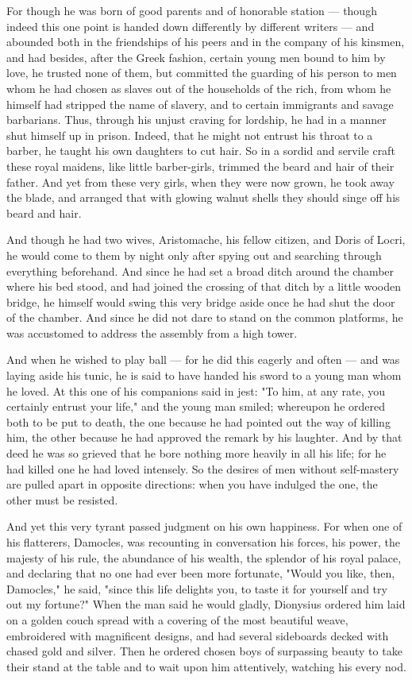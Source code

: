  For though he was born of good parents and of honorable station — though indeed this one point is handed down differently by different writers — and abounded both in the friendships of his peers and in the company of his kinsmen, and had besides, after the Greek fashion, certain young men bound to him by love, he trusted none of them, but committed the guarding of his person to men whom he had chosen as slaves out of the households of the rich, from whom he himself had stripped the name of slavery, and to certain immigrants and savage barbarians. Thus, through his unjust craving for lordship, he had in a manner shut himself up in prison. Indeed, that he might not entrust his throat to a barber, he taught his own daughters to cut hair. So in a sordid and servile craft these royal maidens, like little barber-girls, trimmed the beard and hair of their father. And yet from these very girls, when they were now grown, he took away the blade, and arranged that with glowing walnut shells they should singe off his beard and hair.

 And though he had two wives, Aristomache, his fellow citizen, and Doris of Locri, he would come to them by night only after spying out and searching through everything beforehand. And since he had set a broad ditch around the chamber where his bed stood, and had joined the crossing of that ditch by a little wooden bridge, he himself would swing this very bridge aside once he had shut the door of the chamber. And since he did not dare to stand on the common platforms, he was accustomed to address the assembly from a high tower.

 And when he wished to play ball — for he did this eagerly and often — and was laying aside his tunic, he is said to have handed his sword to a young man whom he loved. At this one of his companions said in jest: "To him, at any rate, you certainly entrust your life," and the young man smiled; whereupon he ordered both to be put to death, the one because he had pointed out the way of killing him, the other because he had approved the remark by his laughter. And by that deed he was so grieved that he bore nothing more heavily in all his life; for he had killed one he had loved intensely. So the desires of men without self-mastery are pulled apart in opposite directions: when you have indulged the one, the other must be resisted.

 And yet this very tyrant passed judgment on his own happiness. For when one of his flatterers, Damocles, was recounting in conversation his forces, his power, the majesty of his rule, the abundance of his wealth, the splendor of his royal palace, and declaring that no one had ever been more fortunate, "Would you like, then, Damocles," he said, "since this life delights you, to taste it for yourself and try out my fortune?" When the man said he would gladly, Dionysius ordered him laid on a golden couch spread with a covering of the most beautiful weave, embroidered with magnificent designs, and had several sideboards decked with chased gold and silver. Then he ordered chosen boys of surpassing beauty to take their stand at the table and to wait upon him attentively, watching his every nod.

